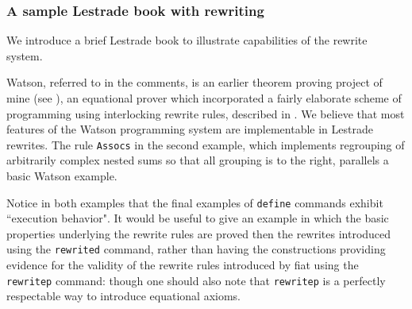 \documentclass[12pt]{article}
\begin{document}
\newpage



\subsubsection{A sample Lestrade book with rewriting}

We introduce a brief Lestrade book to illustrate capabilities of the rewrite system.

Watson, referred to in the comments,  is an earlier theorem proving project of mine (see \cite{watson}), an equational prover which incorporated a fairly elaborate scheme of programming using interlocking rewrite rules, described in \cite{holmesrewriting}.  We believe that most features of the Watson programming system are implementable in Lestrade rewrites.  The rule {\tt Assocs} in the second example, which implements regrouping of arbitrarily complex nested sums so that all grouping is to the right, parallels a basic Watson example.

Notice in both examples that the final examples of {\tt define} commands exhibit ``execution behavior".  It would be useful to give an example in which the basic properties
underlying the rewrite rules are proved then the rewrites introduced using the {\tt rewrited} command, rather than having the constructions providing evidence for the validity of the rewrite rules introduced by fiat using the {\tt rewritep} command:  though one should also note that {\tt rewritep} is a perfectly respectable way to introduce equational axioms.
\end{document}
